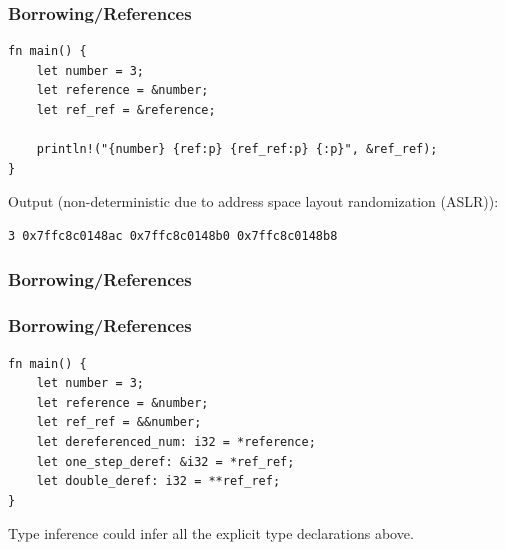 \begin{frame}[fragile]
    \frametitle{Borrowing/References}
    \begin{verbatim}
fn main() {
    let number = 3;
    let reference = &number;
    let ref_ref = &reference;

    println!("{number} {ref:p} {ref_ref:p} {:p}", &ref_ref);
}
    \end{verbatim}
    \pause
    \vfill
    Output (non-deterministic due to address space layout randomization (ASLR)):
    \begin{verbatim}
3 0x7ffc8c0148ac 0x7ffc8c0148b0 0x7ffc8c0148b8
    \end{verbatim}
\end{frame}

\begin{frame}[fragile]
    \frametitle{Borrowing/References}
    \begin{center}
    \end{center}
\end{frame}

\begin{frame}[fragile]
    \frametitle{Borrowing/References}
    \begin{verbatim}
fn main() {
    let number = 3;
    let reference = &number;
    let ref_ref = &&number;
    let dereferenced_num: i32 = *reference;
    let one_step_deref: &i32 = *ref_ref;  
    let double_deref: i32 = **ref_ref;
}
    \end{verbatim}
    \vfill
    Type inference could infer all the explicit type declarations above.
\end{frame}

